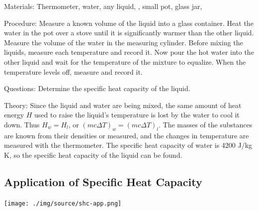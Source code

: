 \begin{multicols}{2}
\begin{description*}
\item[Materials:]{Thermometer, water, any liquid, , small pot, glass jar, }
\item[Procedure:]{Measure a known volume of the liquid into a glass container. Heat the water in the pot over a stove until it is significantly warmer than the other liquid. Measure the volume of the water in the measuring cylinder. Before mixing the liquids, measure each temperature and record it. Now pour the hot water into the other liquid and wait for the temperature of the mixture to equalize. When the temperature levels off, measure and record it.}
\item[Questions:]{Determine the specific heat capacity of the liquid.}
\item[Theory:]{Since the liquid and water are being mixed, the same amount of heat energy $H$ used to raise the liquid’s temperature is lost by the water to cool it down. Thus $H_w = H_l$, or $(mc\Delta T)_{w} = (mc\Delta T)_{l}$. The masses of the substances are known from their densities or measured, and the changes in temperature are measured with the thermometer. The specific heat capacity of water is 4200 J/kg K, so the specific heat capacity of the liquid can be found.}
\end{description*}

\subsection{Application of Specific Heat Capacity}

\begin{center}
\texttt{[image: ./img/source/shc-app.png]}
\end{center}


\end{multicols}
